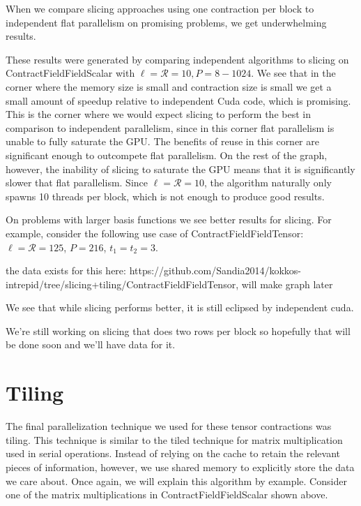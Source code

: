 When we compare slicing approaches using one contraction per block to independent flat parallelism on promising problems, we get underwhelming results. 


These results were generated by comparing independent algorithms to slicing on ContractFieldFieldScalar with $\ell = \mathcal{R} = 10, P = 8 - 1024$. We see that in the corner where the memory size is small and contraction size is small we get a small amount of speedup relative to independent Cuda code, which is promising. This is the corner where we would expect slicing to perform the best in comparison to independent parallelism, since in this corner flat parallelism is unable to fully saturate the GPU. The benefits of reuse in this corner are significant enough to outcompete flat parallelism. On the rest of the graph, however, the inability of slicing to saturate the GPU means that it is significantly slower that flat parallelism. Since $\ell = \mathcal{R} = 10$, the algorithm naturally only spawns 10 threads per block, which is not enough to produce good results. 

On problems with larger basis functions we see better results for slicing. For example, consider the following use case of ContractFieldFieldTensor: $\ell = \mathcal{R} = 125$, $P = 216$, $t_1 = t_2 = 3$.

\vspace{10mm}
the data exists for this here: https://github.com/Sandia2014/kokkos-intrepid/tree/slicing+tiling/ContractFieldFieldTensor, will make graph later


We see that while slicing performs better, it is still eclipsed by independent cuda. 

We're still working on slicing that does two rows per block so hopefully that will be done soon and we'll have data for it. 

\section{Tiling}

The final parallelization technique we used for these tensor contractions was tiling. This technique is similar to the tiled technique for matrix multiplication used in serial operations. Instead of relying on the cache to retain the relevant pieces of information, however, we use shared memory to explicitly store the data we care about. Once again, we will explain this algorithm by example. Consider one of the matrix multiplications in ContractFieldFieldScalar shown above. 

